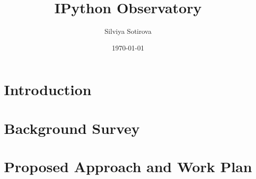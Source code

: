 \documentclass{mprop}
\begin{document}
\title{IPython Observatory}
\author{Silviya Sotirova}
\date{\today}
\maketitle

\tableofcontents
\newpage

\section{Introduction}
\label{intro}


\section{Background Survey}
\label{background}




\section{Proposed Approach and Work Plan}
\label{workplan}





\end{document}
